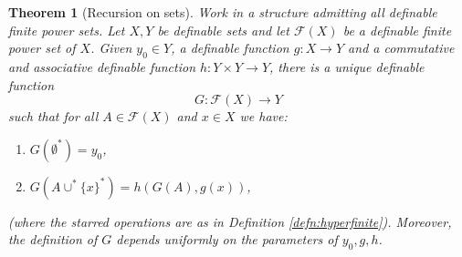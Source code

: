 \documentclass{amsart}
\theoremstyle{plain}
\newtheorem{thm}{Theorem}[section]
\theoremstyle{definition}
\newcommand{\F}{\mathcal{F}}
\begin{document}
\begin{thm}[Recursion on sets] \label{thm:recursion} Work in a structure admitting all definable finite power sets. 
Let $X,Y$ be definable sets and let $\F(X)$ be a definable finite power set of $X$. Given $y_0 \in Y$, a definable function $g: X \to Y$ and a commutative and associative definable function $h: Y \times Y \to Y$, there is a unique definable function 
%
$$G: \F(X) \to Y$$
%
 such that for all $A \in \F(X)$ and $x \in X$ we have: 

\begin{enumerate}
\item $G(\emptyset^*) = y_0$,
\item $G(A \cup^* \{x\}^*) = h(G(A), g(x))$,
\end{enumerate}
(where the starred operations are as in Definition \ref{defn:hyperfinite}).  Moreover, the definition of $G$ depends uniformly on the parameters of $y_0, g, h$. 
\end{thm}
\end{document}
